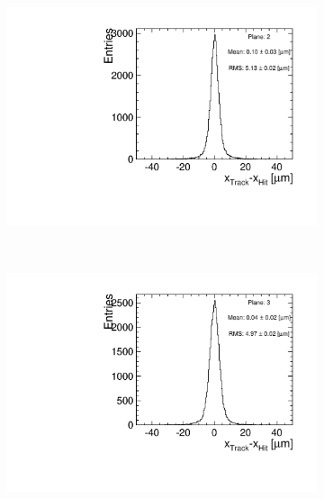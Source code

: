 \begin{figure}[htbp]
\begin{subfigure}[b]{0.3\textwidth}
    \caption{}
  \end{subfigure}\hfill
  \begin{subfigure}[b]{0.3\textwidth}
    \includegraphics[width=\textwidth]{figures/Telescope/biasedResiduals/BiasedResiduals_run661_PlaneXRMS2.pdf}
    \caption{}
  \end{subfigure} \\
  \begin{subfigure}[b]{0.3\textwidth}
    \includegraphics[width=\textwidth]{figures/Telescope/biasedResiduals/BiasedResiduals_run661_PlaneXRMS3.pdf}
    \caption{}
  \end{subfigure}\hfill
  \begin{subfigure}[b]{0.3\textwidth}

\end{subfigure}
\end{figure}
